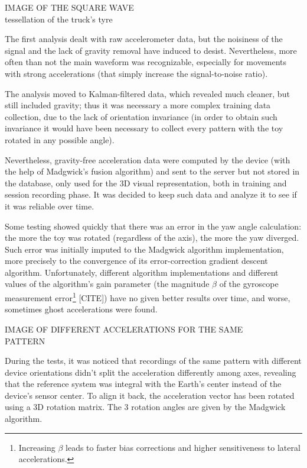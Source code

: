 IMAGE OF THE SQUARE WAVE\\
tessellation of the truck's tyre
\bigbreak

The first analysis dealt with raw accelerometer data, but the noisiness of the signal and the lack of gravity removal have induced to desist. Nevertheless, more often than not the main waveform was recognizable, especially for movements with strong accelerations (that simply increase the signal-to-noise ratio).
\bigbreak

The analysis moved to Kalman-filtered data, which revealed much cleaner, but still included gravity; thus it was necessary a more complex training data collection, due to the lack of orientation invariance (in order to obtain such invariance it would have been necessary to collect every pattern with the toy rotated in any possible angle).

Nevertheless, gravity-free acceleration data were computed by the device (with the help of Madgwick's fusion algorithm) and sent to the server but not stored in the database, only used for the 3D visual representation, both in training and session recording phase. It was decided to keep such data and analyze it to see if it was reliable over time.
\bigbreak

Some testing showed quickly that there was an error in the yaw angle calculation: the more the toy was rotated (regardless of the axis), the more the yaw diverged. Such error was initially imputed to the Madgwick algorithm implementation, more precisely to the convergence of its error-correction gradient descent algorithm. Unfortunately, different algorithm implementations and different values of the algorithm's gain parameter (the magnitude $\beta$ of the gyroscope measurement error\footnote{Increasing $\beta$ leads to faster bias corrections and higher sensitiveness to lateral accelerations.} [CITE]) have no given better results over time, and worse, sometimes ghost accelerations were found.
\bigbreak

IMAGE OF DIFFERENT ACCELERATIONS FOR THE SAME\\ PATTERN
\bigbreak

During the tests, it was noticed that recordings of the same pattern with different device orientations didn't split the acceleration differently among axes, revealing that the reference system was integral with the Earth's center instead of the device's sensor center. To align it back, the acceleration vector has been rotated using a 3D rotation matrix. The 3 rotation angles are given by the Madgwick algorithm.
\bigbreak

